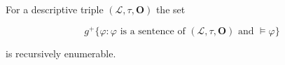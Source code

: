 For a descriptive triple $(\mathcal{L}, \tau, \mathbf{O})$ the set

$$g^{+}\{\varphi : \varphi \text{ is a sentence of } (\mathcal{L}, \tau, \mathbf{O}) \text{ and } \models \varphi\}$$

is recursively enumerable.
